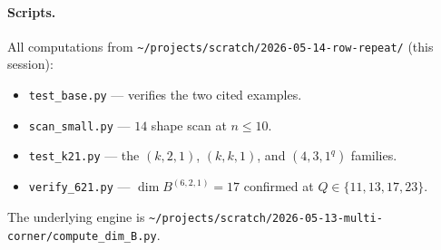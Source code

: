 \documentclass[11pt]{article}
\theoremstyle{definition}
\begin{document}
\paragraph{Scripts.}
All computations from
\texttt{\textasciitilde/projects/scratch/2026-05-14-row-repeat/}
(this session):
\begin{itemize}
\item \texttt{test\_base.py} --- verifies the two cited examples.
\item \texttt{scan\_small.py} --- $14$ shape scan at $n \le 10$.
\item \texttt{test\_k21.py} --- the $(k, 2, 1)$, $(k, k, 1)$, and
$(4, 3, 1^q)$ families.
\item \texttt{verify\_621.py} --- $\dim B^{(6, 2, 1)} = 17$ confirmed
at $Q \in \{11, 13, 17, 23\}$.
\end{itemize}

The underlying engine is
\texttt{\textasciitilde/projects/scratch/2026-05-13-multi-corner/compute\_dim\_B.py}.
\end{document}
